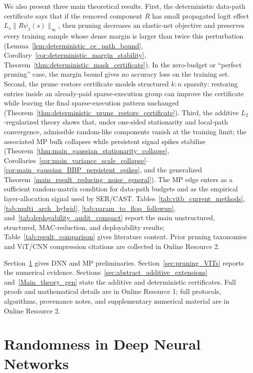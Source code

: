 \documentclass[11pt]{article}
\theoremstyle{plain}
\theoremstyle{definition}
\theoremstyle{remark}
\newcommand{\1}{\mathbf{1}}
\begin{document}
We also present three main theoretical results. First, the deterministic data-path certificate says that if the removed component \(R\) has small propagated logit effect \(L_s\|R\psi_1(s)\|_\infty\), then pruning decreases an elastic-net objective and preserves every training sample whose dense margin is larger than twice this perturbation (Lemma~\ref{lem:deterministic_ce_path_bound}, Corollary~\ref{cor:deterministic_margin_stability}, Theorem~\ref{thm:deterministic_mask_certificate}). In the zero-budget or ``perfect pruning'' case, the margin bound gives no accuracy loss on the training set. Second, the prune--restore certificate models structured \(k{:}n\) sparsity: restoring entries inside an already-paid sparse-execution group can improve the certificate while leaving the final sparse-execution pattern unchanged (Theorem~\ref{thm:deterministic_prune_restore_certificate}). Third, the additive \(L_2\)-regularized theory shows that, under one-sided stationarity and local-path convergence, admissible random-like components vanish at the training limit; the associated MP bulk collapses while persistent signal spikes stabilize (Theorem~\ref{thm:main_gaussian_stationarity_collapse}, Corollaries~\ref{cor:main_variance_scale_collapse}--\ref{cor:main_gaussian_BBP_persistent_spikes}, and the generalized Theorem~\ref{main_result_reducing_noise_general}). The MP edge enters as a sufficient random-matrix condition for data-path budgets and as the empirical layer-allocation signal used by SER/CAST. Tables~\ref{tab:vitb_current_methods}, \ref{tab:multi_arch_hybrid}, \ref{tab:param_to_flop_followup}, and~\ref{tab:deployability_audit_compact} report the main unstructured, structured, MAC-reduction, and deployability results; Table~\ref{tab:result_comparison} gives literature context. Prior pruning taxonomies and ViT/CNN compression citations are collected in Online Resource 2.

Section~\ref{sec:randomness} gives DNN and MP preliminaries. Section~\ref{sec:pruning_VITs} reports the numerical evidence. Sections~\ref{sec:abstract_additive_extensions} and~\ref{Main_theory_gen} state the additive and deterministic certificates. Full proofs and mathematical details are in Online Resource 1; full protocols, algorithms, provenance notes, and supplementary numerical material are in Online Resource 2.

\section{Randomness in Deep Neural Networks}
\label{sec:randomness}
\end{document}
